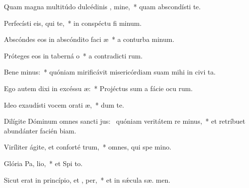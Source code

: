 \item Quam magna multitúdo dulcédinis , mine,~* quam abscondísti  te.
\item Perfecísti eis, qui   te,~* in conspéctu fi minum.
\item Abscóndes eos in abscóndito faci æ~* a conturba minum.
\item Próteges eos in taberná o~* a contradicti rum.
\item Bene minus:~* quóniam mirificávit misericórdiam suam mihi in civi ta.
\item Ego autem dixi in excéssu  æ:~* Projéctus sum a fácie ocu rum.
\item Ideo exaudísti vocem orati æ,~* dum   te.
\item Dilígite Dóminum omnes sancti jus:~\pscross{} quóniam veritátem re minus,~* et retríbuet abundánter facién biam.
\item Viríliter ágite, et conforté  trum,~* omnes, qui spe  mino.
\item Glória Pa,  lio,~* et Spi to.
\item Sicut erat in princípio, et ,  per,~* et in sǽcula sæ. men.
